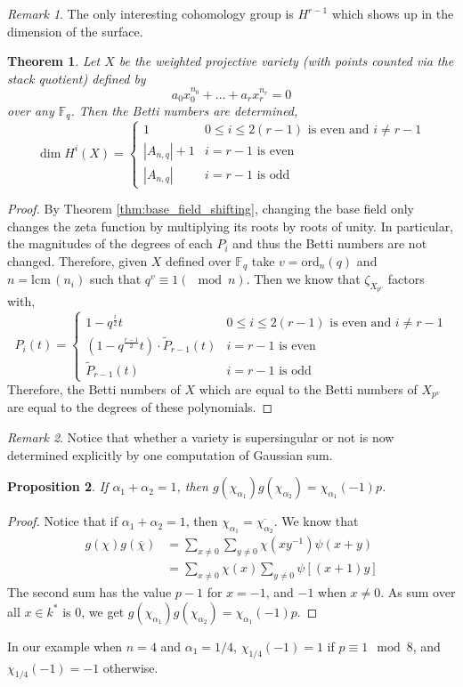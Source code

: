 \documentclass{article}
\newcommand{\F}{\mathbb{F}}
\newcommand{\lcm}[0]{\mathrm{lcm} \,}
\newcommand{\ord}[0]{\mathrm{ord}}
\newtheorem{theorem}{Theorem}[section]
\newtheorem{proposition}[theorem]{Proposition}
\theoremstyle{definition}
\theoremstyle{definition}
\theoremstyle{remark}
\newtheorem*{remark}{Remark}
\begin{document}
\begin{remark}
The only interesting cohomology group is $H^{r-1}$ which shows up in the dimension of the surface.
\end{remark}

\begin{theorem}
Let $X$ be the weighted projective variety (with points counted via the stack quotient) defined by 
\[ a_0 x_0^{n_0} + \dots + a_r x_r^{n_r} = 0 \] 
over any $\F_q$. Then the Betti numbers are determined,
\[ 
\dim H^i(X) = 
\begin{cases}
1  & 0 \le i \le 2(r-1) \text{ is even and } i \neq r - 1 \\
|A_{n,q}| + 1 & i = r-1 \text{ is even} \\
|A_{n,q}| & i = r - 1 \text{ is odd}
\end{cases}
\]
\end{theorem}

\begin{proof}
By Theorem \ref{thm:base_field_shifting}, changing the base field only changes the zeta function by multiplying its roots by roots of unity. In particular, the magnitudes of the degrees of each $P_i$ and thus the Betti numbers are not changed. Therefore, given $X$ defined over $\F_q$ take $v = \ord_n(q)$ and $n = \lcm(n_i)$ such that $q^v \equiv 1 (\mod n)$. Then we know that $\zeta_{X_{p^v}}$ factors with,  
\[ P_i(t) = 
\begin{cases}
1 - q^{\frac{i}{2}} t  & 0 \le i \le 2(r-1) \text{ is even and } i \neq r - 1 \\
(1 - q^{\frac{r-1}{2}} t) \cdot \tilde{P}_{r-1}(t) & i = r-1 \text{ is even} \\
 \tilde{P}_{r-1}(t) & i = r - 1 \text{ is odd}
\end{cases}
\]
Therefore, the Betti numbers of $X$ which are equal to the Betti numbers of $X_{p^v}$ are equal to the degrees of these polynomials. 
\end{proof}

\begin{remark}
Notice that whether a variety is supersingular or not is now determined explicitly by one computation of Gaussian sum.
\end{remark}
 
\begin{proposition}
If $\alpha_1 + \alpha_2 = 1$, then $g(\chi_{\alpha_1})g(\chi_{\alpha_2}) = \chi_{\alpha_1}(-1) p$.
\end{proposition}
\begin{proof}
Notice that if $\alpha_1 + \alpha_2 = 1$, then $\chi_{\alpha_1} = \overline{\chi_{\alpha_2}}$. We know that 
\begin{align*}
g(\chi)g(\overline \chi) &= \sum_{x \ne 0}\sum_{y \ne 0} \chi(xy^{-1}) \psi(x+y)\\
&= \sum_{x \ne 0} \chi(x)\sum_{y \ne 0} \psi[(x+1)y]
\end{align*}
The second sum has the value $p-1$ for $x = -1$, and $-1$ when $x \ne 0$. As sum over all $x \in k^*$ is $0$, we get $g(\chi_{\alpha_1})g(\chi_{\alpha_2}) = \chi_{\alpha_1}(-1) p$.
\end{proof}
In our example when $n = 4$ and $\alpha_1 = 1/4$, $\chi_{1/4}(-1) = 1$ if $p \equiv 1 \mod 8$, and $\chi_{1/4}(-1) = -1$ otherwise.
\end{document}

